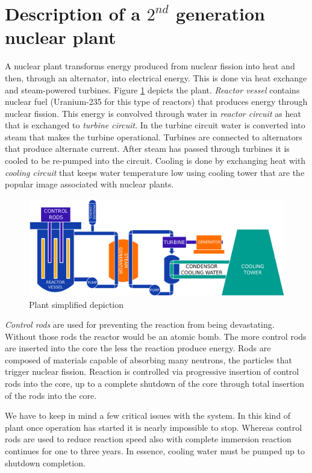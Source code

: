 \documentclass[10pt,a4paper]{report}
\begin{document}
\section{Description of a $2^{nd}$ generation nuclear plant}
A nuclear plant transforms energy produced from nuclear fission into heat and 
then, through an alternator, into electrical energy. This is done via heat 
exchange and steam-powered turbines. Figure \ref{nuclearimg} depicts
the plant. \emph{Reactor vessel} contains nuclear fuel (Uranium-235 for this 
type of reactors) that produces energy through nuclear fission. This energy is 
convolved through water in \emph{reactor circuit} as heat that is exchanged to 
\emph{turbine circuit}. In the turbine circuit water is converted into steam 
that makes the turbine operational. Turbines are connected to alternators that 
produce alternate current. After steam has passed through turbines it is cooled 
to be re-pumped into the circuit. Cooling is done by exchanging heat with 
\emph{cooling circuit} that keeps water temperature low using cooling tower that 
are the popular image associated with nuclear plants.
\begin{figure}[htb]
\centering
\includegraphics[width=\textwidth]{images/Nuclear_Plant}
\caption{Plant simplified depiction}
\label{nuclearimg}
\end{figure}

\emph{Control rods} are used for preventing the reaction from being devastating. 
Without those rods the reactor would be an atomic bomb. The more control 
rods are inserted into the core the less the reaction produce energy. Rods are 
composed of materials capable of absorbing many neutrons, the particles 
that trigger nuclear fission. Reaction is controlled via progressive insertion 
of control rods into the core, up to a complete shutdown of the core through 
total insertion of the rods into the core. 

We have to keep in mind a few critical issues with the system. In this 
kind of plant once operation has started it is nearly impossible to stop. 
Whereas control rods are used to reduce reaction speed also with complete 
immersion reaction continues for one to three years. In essence, cooling water
must be pumped up to shutdown completion. 
\end{document}
